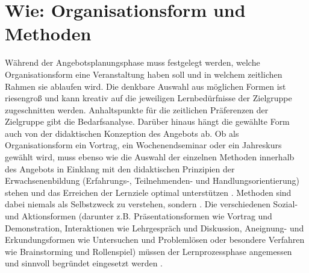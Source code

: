 \documentclass[
  twoside,
  parskip=half-,
]{scrreprt}
\begin{document}
\section{Wie: Organisationsform und Methoden}

Während der Angebotsplanungsphase muss festgelegt werden, welche Organisationsform eine Veranstaltung haben soll und in welchem zeitlichen Rahmen sie ablaufen wird. Die denkbare Auswahl aus möglichen Formen ist riesengroß und kann kreativ auf die jeweiligen Lernbedürfnisse der Zielgruppe zugeschnitten werden. Anhaltspunkte für die zeitlichen Präferenzen der Zielgruppe gibt die Bedarfsanalyse. Darüber hinaus hängt die gewählte Form auch von der didaktischen Konzeption des Angebots ab. Ob als Organisationsform ein Vortrag, ein Wochenendseminar oder ein Jahreskurs gewählt wird, muss ebenso wie die Auswahl der einzelnen Methoden innerhalb des Angebots in Einklang mit den didaktischen Prinzipien der Erwachsenenbildung (Erfahrungs-, Teilnehmenden- und Handlungsorientierung) stehen und das Erreichen der Lernziele optimal unterstützen \autocite[vgl.][1009]{reich-claassen}. Methoden sind dabei niemals als Selbstzweck zu verstehen, sondern . Die verschiedenen Sozial- und Aktionsformen (darunter z.B. Präsentationsformen wie Vortrag und Demonstration, Interaktionen wie Lehrgespräch und Diskussion, Aneignung- und Erkundungsformen wie Untersuchen und Problemlösen oder besondere Verfahren wie Brainstorming und Rollenspiel) müssen der Lernprozessphase angemessen und sinnvoll begründet eingesetzt werden \autocite[vgl.][101]{schlutz}.
\end{document}
